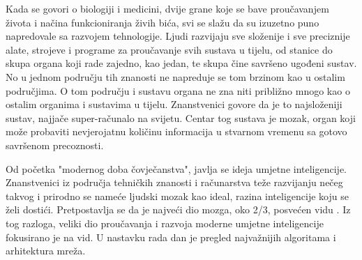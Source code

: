 Kada se govori o biologiji i medicini, dvije grane koje se bave proučavanjem života i načina funkcioniranja živih bića, svi se slažu da su izuzetno puno napredovale sa razvojem tehnologije. Ljudi razvijaju sve složenije i sve preciznije alate, strojeve i programe za proučavanje svih sustava u tijelu, od stanice do skupa organa koji rade zajedno, kao jedan, te skupa čine savršeno ugođeni sustav. No u jednom području tih znanosti ne napreduje se tom brzinom kao u ostalim područjima. O tom području i sustavu organa ne zna niti približno mnogo kao o ostalim organima i sustavima u tijelu. Znanstvenici govore da je to najsloženiji sustav, najjače super-računalo na svijetu. Centar tog sustava je mozak, organ koji može probaviti nevjerojatnu količinu informacija u stvarnom vremenu sa gotovo savršenom precoznosti. \par

Od početka "modernog doba čovječanstva", javlja se ideja umjetne inteligencije. Znanstvenici iz područja tehničkih znanosti i računarstva teže razvijanju nečeg takvog i prirodno se nameće ljudski mozak kao ideal, razina inteligencije koju se želi dostići. Pretpostavlja se da je najveći dio mozga, oko 2/3, posvećen vidu \citep{vision_percentage}. Iz tog razloga, veliki dio proučavanja i razvoja moderne umjetne inteligencije fokusirano je na vid. U nastavku rada dan je pregled najvažnijih algoritama i arhitektura mreža.